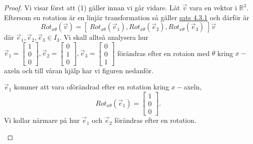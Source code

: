 \documentclass{article}
\theoremstyle{definition}
\begin{document}
\begin{proof}
  Vi visar först att (1) gäller innan vi går vidare. Låt $\vec{v}$ vara en vektor i $\mathbb{R}^3$. 
  Eftersom en rotation är en linjär transformation så gäller \hyperlink{linjarTsats}{sats 4.3.1} och 
  därför är
  \[Rot_{x\theta} (\vec{v}) = [\; Rot_{x\theta} (\vec{e}_1), Rot_{x\theta} (\vec{e}_2), 
  Rot_{x\theta} (\vec{e}_3)\;] \vec{v}\]
  där $\vec{e}_1, \vec{e}_2, \vec{e}_3 \in I_3.$
  Vi skall alltså analysera hur $\vec{e}_1 = 
  \begin{bmatrix}
    1 \\
    0 \\
    0
  \end{bmatrix}
  , \vec{e}_2 = 
  \begin{bmatrix}
    0 \\
    1 \\
    0
  \end{bmatrix}
  , \vec{e}_3 = 
  \begin{bmatrix}
    0 \\
    0\\
    1
  \end{bmatrix}
  $ förändras efter en rotaion med 
  $\theta$ kring $x-$axeln och till våran hjälp har vi figuren nedanför. 

  \newcommand{\AxisRotator}[1][rotate=0]{%
    \tikz [x=0.2cm,y=0.60cm,line width=.2ex,-stealth,#1] \draw (0,0) arc (-150:150:1 and 1);%
  }

  \begin{center}
  \end{center}
  $\vec{e}_1$ kommer att vara oförändrad efter en rotation kring $x-$axeln, 
  \[Rot_{x\theta}(\vec{e}_1) = 
  \begin{bmatrix}
    1 \\
    0 \\
    0
  \end{bmatrix}
  .\]
  Vi kollar närmare på hur $\vec{e}_1$ och $\vec{e}_2$ förändras efter en rotation. 
  \begin{center}
\end{center}
\end{proof}
\end{document}
